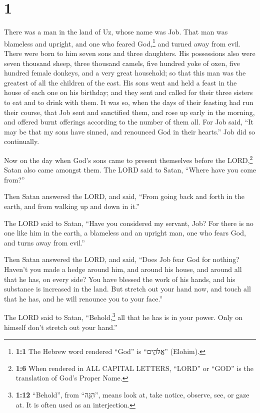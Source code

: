 \hypertarget{section}{%
\section{1}\label{section}}

 There was a man in the land of Uz, whose name was Job.
That man was blameless and upright, and one who feared God,\footnote{\textbf{1:1}
  The Hebrew word rendered ``God'' is ``אֱלֹהִ֑ים'' (Elohim).} and
turned away from evil.  There were born to him seven sons
and three daughters.  His possessions also were seven
thousand sheep, three thousand camels, five hundred yoke of oxen, five
hundred female donkeys, and a very great household; so that this man was
the greatest of all the children of the east.  His sons
went and held a feast in the house of each one on his birthday; and they
sent and called for their three sisters to eat and to drink with them.
 It was so, when the days of their feasting had run their
course, that Job sent and sanctified them, and rose up early in the
morning, and offered burnt offerings according to the number of them
all. For Job said, ``It may be that my sons have sinned, and renounced
God in their hearts.'' Job did so continually.

 Now on the day when God's sons came to present themselves
before the LORD,\footnote{\textbf{1:6} When rendered in ALL CAPITAL
  LETTERS, ``LORD'' or ``GOD'' is the translation of God's Proper Name.}
Satan also came amongst them.  The LORD said to Satan,
``Where have you come from?''

Then Satan answered the LORD, and said, ``From going back and forth in
the earth, and from walking up and down in it.''

 The LORD said to Satan, ``Have you considered my servant,
Job? For there is no one like him in the earth, a blameless and an
upright man, one who fears God, and turns away from evil.''

 Then Satan answered the LORD, and said, ``Does Job fear
God for nothing?  Haven't you made a hedge around him,
and around his house, and around all that he has, on every side? You
have blessed the work of his hands, and his substance is increased in
the land.  But stretch out your hand now, and touch all
that he has, and he will renounce you to your face.''

 The LORD said to Satan, ``Behold,\footnote{\textbf{1:12}
  ``Behold'', from ``הִנֵּה'', means look at, take notice, observe, see,
  or gaze at. It is often used as an interjection.} all that he has is
in your power. Only on himself don't stretch out your hand.''

